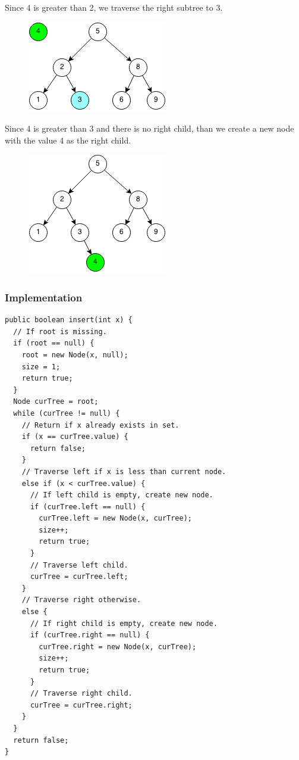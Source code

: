 \documentclass[11pt,oneside]{book}
\makeatletter
\def\maxwidth#1{\ifdim\Gin@nat@width>#1 #1\else\Gin@nat@width\fi}
\makeatother
\begin{document}
Since 4 is greater than 2, we traverse the right subtree to 3.

\vspace{5px}\begin{figure}[H]\centering
        \includegraphics[width=0.66\maxwidth{\textwidth}]{bstinsert3.png}
        \end{figure}

Since 4 is greater than 3 and there is no right child, than we create a new node with the value 4 as the right child.

\vspace{5px}\begin{figure}[H]\centering
        \includegraphics[width=0.66\maxwidth{\textwidth}]{bstinsert4.png}
        \end{figure}

\subsubsection{Implementation}

\begin{lstlisting}
public boolean insert(int x) {
  // If root is missing.
  if (root == null) {
    root = new Node(x, null);
    size = 1;
    return true;
  }
  Node curTree = root;
  while (curTree != null) {
    // Return if x already exists in set.
    if (x == curTree.value) {
      return false;
    }
    // Traverse left if x is less than current node.
    else if (x < curTree.value) {
      // If left child is empty, create new node.
      if (curTree.left == null) {
        curTree.left = new Node(x, curTree);
        size++;
        return true;
      }
      // Traverse left child.
      curTree = curTree.left;
    }
    // Traverse right otherwise.
    else {
      // If right child is empty, create new node.
      if (curTree.right == null) {
        curTree.right = new Node(x, curTree);
        size++;
        return true;
      }
      // Traverse right child.
      curTree = curTree.right;
    }
  }
  return false;
}
\end{lstlisting}
\end{document}
